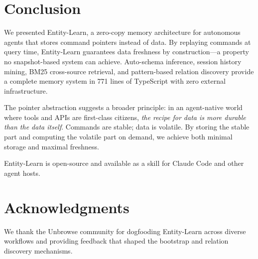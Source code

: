 \documentclass[11pt,twocolumn]{article}
\begin{document}
\section{Conclusion}
\label{sec:conclusion}

We presented Entity-Learn, a zero-copy memory architecture for autonomous agents that stores command pointers instead of data.
By replaying commands at query time, Entity-Learn guarantees data freshness by construction---a property no snapshot-based system can achieve.
Auto-schema inference, session history mining, BM25 cross-source retrieval, and pattern-based relation discovery provide a complete memory system in 771 lines of TypeScript with zero external infrastructure.

The pointer abstraction suggests a broader principle: in an agent-native world where tools and APIs are first-class citizens, \emph{the recipe for data is more durable than the data itself}.
Commands are stable; data is volatile.
By storing the stable part and computing the volatile part on demand, we achieve both minimal storage and maximal freshness.

Entity-Learn is open-source and available as a skill for Claude Code and other agent hosts.


\section*{Acknowledgments}

We thank the Unbrowse community for dogfooding Entity-Learn across diverse workflows and providing feedback that shaped the bootstrap and relation discovery mechanisms.



\end{document}
